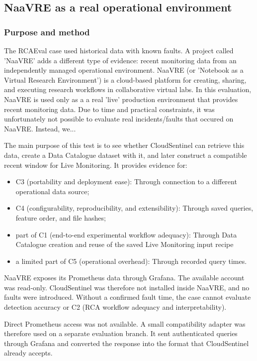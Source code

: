 \subsection{NaaVRE as a real operational environment}

\subsubsection{Purpose and method}

The RCAEval case used historical data with known faults. A project called 'NaaVRE' adds a different type of evidence: recent monitoring data from an independently managed operational environment. NaaVRE (or 'Notebook as a Virtual Research Environment') is a cloud-based platform for creating, sharing, and executing research workflows in collaborative virtual labs. In this evaluation, NaaVRE is used only as a a real 'live' production environment that provides recent monitoring data. Due to time and practical constraints, it was unfortunately not possible to evaluate real incidents/faults that occured on NaaVRE. Instead, we... 

The main purpose of this test is to see whether CloudSentinel can retrieve this data, create a Data Catalogue dataset with it, and later construct a compatible recent window for Live Monitoring. It provides evidence for:
\begin{itemize}
    \item C3 (portability and deployment ease): Through connection to a different operational data source;
    \item C4 (configurability, reproducibility, and extensibility): Through saved queries, feature order, and file hashes;
    \item part of C1 (end-to-end experimental workflow adequacy): Through Data Catalogue creation and reuse of the saved Live Monitoring input recipe
    \item a limited part of C5 (operational overhead): Through recorded query times.
\end{itemize}

NaaVRE exposes its Prometheus data through Grafana. The available account was read-only. CloudSentinel was therefore not installed inside NaaVRE, and no faults were introduced. Without a confirmed fault time, the case cannot evaluate detection accuracy or C2 (RCA workflow adequacy and interpretability).

Direct Prometheus access was not available. A small compatibility adapter was therefore used on a separate evaluation branch. It sent authenticated queries through Grafana and converted the response into the format that CloudSentinel already accepts.

